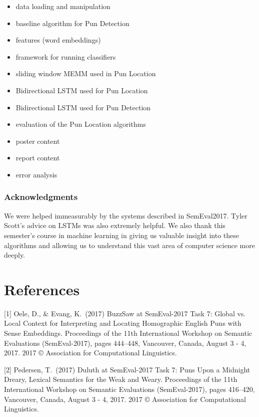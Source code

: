 \documentclass{article}
\begin{document}
\begin{itemize}
\begin{itemize}
		\item data loading and manipulation
		\item baseline algorithm for Pun Detection
		\item features (word embeddings)
		\item framework for running classifiers
		\item sliding window MEMM used in Pun Location
		\item Bidirectional LSTM used for Pun Location
		\item Bidirectional LSTM used for Pun Detection
		\item evaluation of the Pun Location algorithms
		\item poster content
		\item report content
		\item error analysis
	\end{itemize}
\end{itemize}

\subsubsection*{Acknowledgments}

We were helped immeasurably by the systems described in SemEval2017. Tyler
Scott's advice on LSTMs was also extremely helpful. We also thank this semester's course in machine learning in giving us valuable insight into these algorithms and allowing us to understand this vast area of computer science more deeply.

\section*{References}

\medskip

\small

[1] Oele, D., \& Evang, K.\ (2017) BuzzSaw at SemEval-2017 Task 7:
Global vs. Local Context for Interpreting and Locating Homographic English Puns
with Sense Embeddings. Proceedings of the 11th International Workshop on
Semantic Evaluations (SemEval-2017), pages 444–448, Vancouver, Canada, August 3
- 4, 2017. 2017 © Association for Computational Linguistics.

[2] Pedersen, T.\ (2017) Duluth at SemEval-2017 Task 7: Puns Upon a Midnight
Dreary, Lexical Semantics for the Weak and Weary. Proceedings of the 11th
International Workshop on Semantic Evaluations (SemEval-2017), pages 416–420,
Vancouver, Canada, August 3 - 4, 2017. 2017 © Association for Computational
Linguistics.
\end{document}
